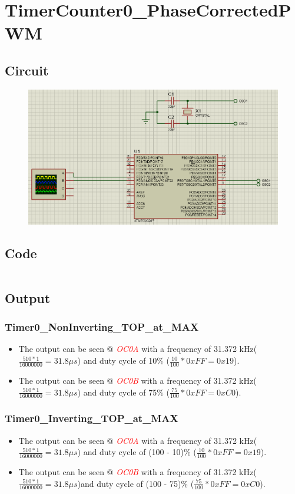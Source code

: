 \documentclass[oneside]{book}
\newcommand{\pinFormat}[1]{\emph{\textcolor{red}{#1}}}
\begin{document}
\section{TimerCounter0\_PhaseCorrectedPWM}
\subsection{Circuit}
\begin{figure}[H]
    \centering
    \includegraphics[height=0.2\textheight]{TimerCounter0_PhaseCorrectedPWM.png}
\end{figure}
\subsection{Code}
\inputminted[breaklines, bgcolor=black]{c}{./programFiles/TimerCounter0_PhaseCorrectedPWM.c}
\subsection{Output}
\subsubsection{Timer0\_NonInverting\_TOP\_at\_MAX}
\begin{itemize}
    \item The output can be seen @ \pinFormat{OC0A} with a frequency of 31.372 kHz($\frac{510 * 1}{16000000} = 31.8\mu s$) and duty cycle of 10\% ($\frac{10}{100} * 0xFF = 0x19$).
    \item The output can be seen @ \pinFormat{OC0B} with a frequency of 31.372 kHz($\frac{510 * 1}{16000000} = 31.8\mu s$) and duty cycle of 75\% ($\frac{75}{100} * 0xFF = 0xC0$).
\end{itemize}
\subsubsection{Timer0\_Inverting\_TOP\_at\_MAX}
\begin{itemize}
    \item The output can be seen @ \pinFormat{OC0A} with a frequency of 31.372 kHz($\frac{510 * 1}{16000000} = 31.8\mu s$) and duty cycle of (100 - 10)\% ($\frac{10}{100} * 0xFF = 0x19$).
    \item The output can be seen @ \pinFormat{OC0B} with a frequency of 31.372 kHz($\frac{510 * 1}{16000000} = 31.8\mu s$)and duty cycle of (100 - 75)\% ($\frac{75}{100} * 0xFF = 0xC0$).
\end{itemize}
\end{document}
